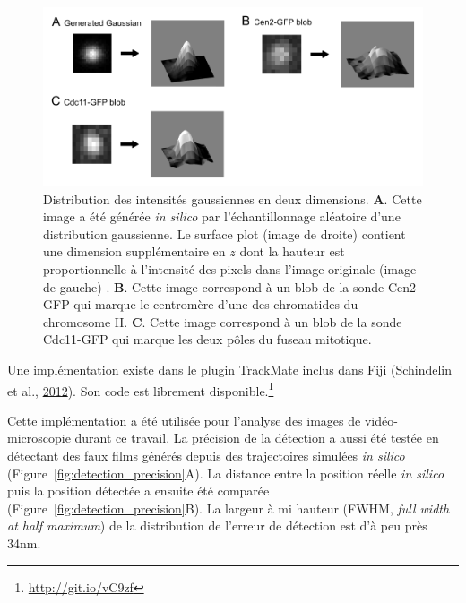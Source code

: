 \documentclass[12pt,a4paper,twoside,openright]{book}
\begin{document}
\begin{figure}[htbp]
\centering
\includegraphics{figures/results/imaging/gaussian.png}
\caption[Distribution des intensités gaussiennes en deux dimensions]{\label{fig:gaussian}Distribution
des intensités gaussiennes en deux dimensions. \textbf{A}. Cette image a
été générée \emph{in silico} par l'échantillonnage aléatoire d'une
distribution gaussienne. Le surface plot (image de droite) contient une
dimension supplémentaire en \(z\) dont la hauteur est proportionnelle à
l'intensité des pixels dans l'image originale (image de gauche) .
\textbf{B}. Cette image correspond à un blob de la sonde Cen2-GFP qui
marque le centromère d'une des chromatides du chromosome II. \textbf{C}.
Cette image correspond à un blob de la sonde Cdc11-GFP qui marque les
deux pôles du fuseau mitotique.}
\end{figure}

Une implémentation existe dans le plugin TrackMate inclus dans Fiji
(Schindelin et al., \hyperref[ref-Schindelin2012]{2012}). Son code est
librement disponible.\footnote{\url{http://git.io/vC9zf}}

Cette implémentation a été utilisée pour l'analyse des images de
vidéo-microscopie durant ce travail. La précision de la détection a
aussi été testée en détectant des faux films générés depuis des
trajectoires simulées \emph{in silico}
(Figure~\ref{fig:detection_precision}A). La distance entre la position
réelle \emph{in silico} puis la position détectée a ensuite été comparée
(Figure~\ref{fig:detection_precision}B). La largeur à mi hauteur (FWHM,
\emph{full width at half maximum}) de la distribution de l'erreur de
détection est d'à peu près 34nm.
\end{document}
